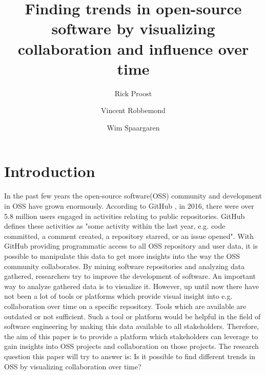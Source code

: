\documentclass[acmtog, authorversion]{acmart}
\begin{document}
\title{Finding trends in open-source software by visualizing collaboration and influence over time} 

\author{Rick Proost}

\author{Vincent Robbemond}

\author{Wim Spaargaren}

\maketitle

\begin{abstract}
	
\end{abstract}

\section{Introduction}
In the past few years the open-source software(OSS) community and development in OSS have grown enormously.
According to GitHub \cite{GHOctoverse}, in 2016, there were over 5.8 million users engaged in activities relating to public repositories.
GitHub defines these activities as "some activity within the last year, e.g. code committed, a comment created, a repository starred, or an issue opened".
With GitHub providing programmatic access to all OSS repository and user data\cite{GHAPI}, it is possible to manipulate this data to get more insights into the way the OSS community collaborates.
By mining software repositories and analyzing data gathered, researchers try to improve the development of software.
An important way to analyze gathered data is to visualize it.
However, up until now there have not been a lot of tools or platforms which provide visual insight into e.g. collaboration over time on a specific repository.
Tools which are available are outdated or not sufficient.
Such a tool or platform would be helpful in the field of software engineering by making this data available to all stakeholders.
Therefore, the aim of this paper is to provide a platform which stakeholders can leverage to gain insights into OSS projects and collaboration on those projects.
The research question this paper will try to answer is: Is it possible to find different trends in OSS by visualizing collaboration over time?
\end{document}
